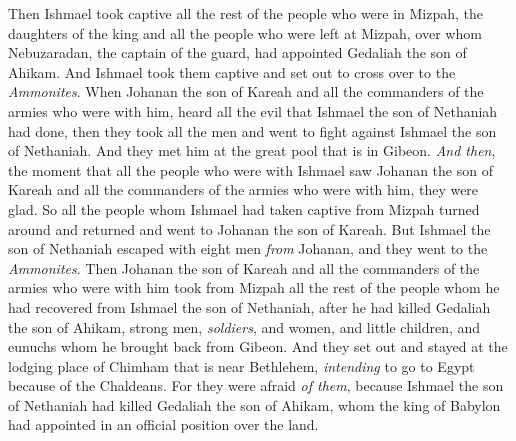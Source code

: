 \begin{biblechapter}
\verse Then Ishmael took captive all the rest of the people who were in Mizpah, the daughters of the king and all the people who were left at Mizpah, over whom Nebuzaradan, the captain of the guard, had appointed Gedaliah the son of Ahikam. And Ishmael took them captive and set out to cross over to the \textit{Ammonites}.
\verse When Johanan the son of Kareah and all the commanders of the armies who were with him, heard all the evil that Ishmael the son of Nethaniah had done,
\verse then they took all the men and went to fight against Ishmael the son of Nethaniah. And they met him at the great pool that is in Gibeon.
\verse \textit{And then}, the moment that all the people who were with Ishmael saw Johanan the son of Kareah and all the commanders of the armies who were with him, they were glad.
\verse So all the people whom Ishmael had taken captive from Mizpah turned around and returned and went to Johanan the son of Kareah.
\verse But Ishmael the son of Nethaniah escaped with eight men \textit{from} Johanan, and they went to the \textit{Ammonites}.
\verse Then Johanan the son of Kareah and all the commanders of the armies who were with him took from Mizpah all the rest of the people whom he had recovered from Ishmael the son of Nethaniah, after he had killed Gedaliah the son of Ahikam, strong men, \textit{soldiers}, and women, and little children, and eunuchs whom he brought back from Gibeon.
\verse And they set out and stayed at the lodging place of Chimham that is near Bethlehem, \textit{intending} to go to Egypt
\verse because of the Chaldeans. For they were afraid \textit{of them}, because Ishmael the son of Nethaniah had killed Gedaliah the son of Ahikam, whom the king of Babylon had appointed in an official position over the land.
\end{biblechapter}

